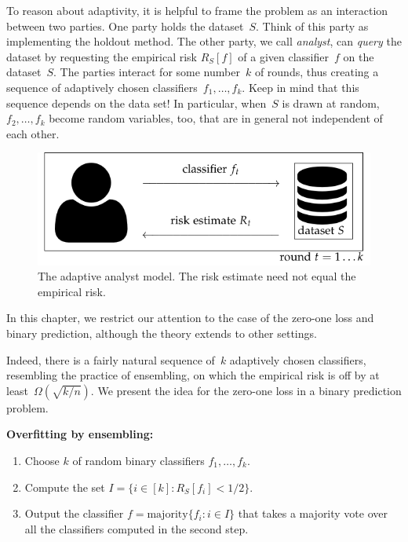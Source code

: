 \documentclass{tufte-book}
\begin{document}
To reason about adaptivity, it is helpful to frame the problem as an
interaction between two parties. One party holds the dataset~\(S\).
Think of this party as implementing the holdout method. The other party,
we call \emph{analyst}, can \emph{query} the dataset by requesting the
empirical risk \(R_S[f]\) of a given classifier~\(f\) on the
dataset~\(S\). The parties interact for some number~\(k\) of rounds,
thus creating a sequence of adaptively chosen
classifiers~\(f_1,\dots,f_k.\) Keep in mind that this sequence depends
on the data set! In particular, when~\(S\) is drawn at
random,~\(f_2,\dots, f_k\) become random variables, too, that are in
general not independent of each
other.

\begin{figure}
\centering
\includegraphics[width=1\textwidth,height=\textheight]{assets/datasets-adaptiveanalyst}
\caption{The adaptive analyst model. The risk estimate need not equal
the empirical risk.}
\end{figure}

In this chapter, we restrict our attention to the case of the zero-one
loss and binary prediction, although the theory extends to other
settings.

Indeed, there is a fairly natural sequence of~\(k\) adaptively chosen
classifiers, resembling the practice of ensembling, on which the
empirical risk is off by at least~\(\Omega(\sqrt{k/n}).\) We present the
idea for the zero-one loss in a binary prediction
problem.

\begin{Algorithm}

\textbf{Overfitting by ensembling:}

\begin{enumerate}
\def\labelenumi{\arabic{enumi}.}
\tightlist
\item
  Choose \(k\) of random binary classifiers \(f_1,\dots, f_k.\)
\item
  Compute the set \(I=\{i\in[k]\colon R_S[f_i] < 1/2\}.\)
\item
  Output the classifier \(f=\mathrm{majority}\{ f_i \colon i\in I \}\)
  that takes a majority vote over all the classifiers computed in the
  second step.
\end{enumerate}

\end{Algorithm}
\end{document}
